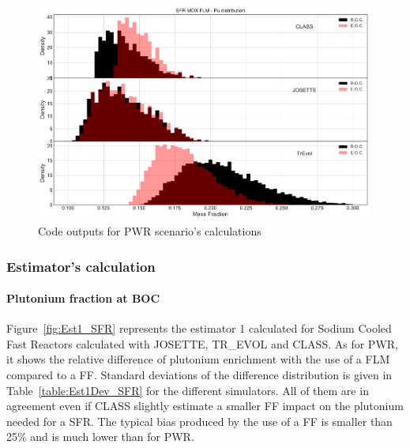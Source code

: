 \begin{figure}[h]
	\begin{center}
		\includegraphics[width = 0.99\textwidth]{../../Feature_1/RAW_DATA/FIG/SFR_MOX_FLM_Pu.pdf}
		\caption{Code outputs for \gls{PWR} scenario's calculations}
		\label{fig:SFR_MOX_FLM_Pu}
	\end{center}
\end{figure}

\subsubsection{Estimator's calculation}
\paragraph{Plutonium fraction at \gls{BOC}}

Figure~\ref{fig:Est1_SFR} represents the estimator 1 calculated for Sodium Cooled Fast Reactors calculated with JOSETTE, TR\_EVOL and CLASS.
As for \gls{PWR}, it shows the relative difference of plutonium enrichment with the use of a \gls{FLM} compared to a \gls{FF}.
Standard deviations of the difference distribution is given in Table~\ref{table:Est1Dev_SFR} for the different simulators.
All of them are in agreement even if CLASS slightly estimate a smaller \gls{FF} impact on the plutonium needed for a \gls{SFR}.
The typical bias produced by the use of a \gls{FF} is smaller than 25\% and is much lower than for \gls{PWR}.

